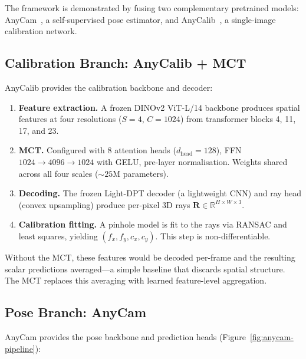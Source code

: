 The framework is demonstrated by fusing two complementary pretrained models: AnyCam~\parencite{wimbauer2025anycam}, a self-supervised pose estimator, and AnyCalib~\parencite{tirado2025anycalib}, a single-image calibration network.

\subsection{Calibration Branch: AnyCalib + MCT}\label{sec:calib-branch}

AnyCalib provides the calibration backbone and decoder:

\begin{enumerate}
    \item \textbf{Feature extraction.} A frozen DINOv2 ViT-L/14 backbone produces spatial features at four resolutions ($S=4$, $C=1024$) from transformer blocks 4, 11, 17, and 23.

    \item \textbf{MCT.} Configured with 8 attention heads ($d_{\text{head}} = 128$), FFN $1024 \to 4096 \to 1024$ with GELU, pre-layer normalisation. Weights shared across all four scales (${\sim}25$M parameters).

    \item \textbf{Decoding.} The frozen Light-DPT decoder (a lightweight CNN) and ray head (convex upsampling) produce per-pixel 3D rays $\mathbf{R} \in \mathbb{R}^{H \times W \times 3}$.

    \item \textbf{Calibration fitting.} A pinhole model is fit to the rays via RANSAC and least squares, yielding $(f_x, f_y, c_x, c_y)$. This step is non-differentiable.
\end{enumerate}

Without the MCT, these features would be decoded per-frame and the resulting scalar predictions averaged---a simple baseline that discards spatial structure. The MCT replaces this averaging with learned feature-level aggregation.

\subsection{Pose Branch: AnyCam}\label{sec:pose-branch}

AnyCam provides the pose backbone and prediction heads (Figure~\ref{fig:anycam-pipeline}):

